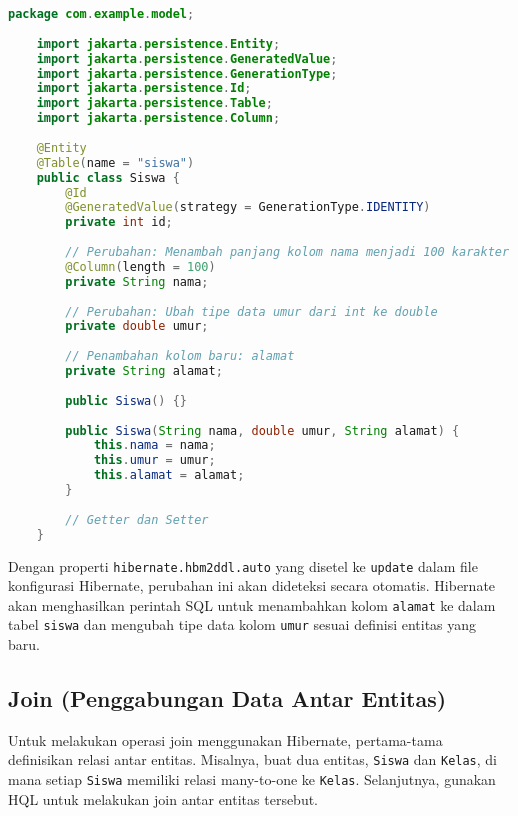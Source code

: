 \begin{lstlisting}[language=Java, style=JavaStyle]
	package com.example.model;
	
	import jakarta.persistence.Entity;
	import jakarta.persistence.GeneratedValue;
	import jakarta.persistence.GenerationType;
	import jakarta.persistence.Id;
	import jakarta.persistence.Table;
	import jakarta.persistence.Column;
	
	@Entity
	@Table(name = "siswa")
	public class Siswa {
		@Id
		@GeneratedValue(strategy = GenerationType.IDENTITY)
		private int id;
		
		// Perubahan: Menambah panjang kolom nama menjadi 100 karakter
		@Column(length = 100)
		private String nama;
		
		// Perubahan: Ubah tipe data umur dari int ke double
		private double umur;
		
		// Penambahan kolom baru: alamat
		private String alamat;
		
		public Siswa() {}
		
		public Siswa(String nama, double umur, String alamat) {
			this.nama = nama;
			this.umur = umur;
			this.alamat = alamat;
		}
		
		// Getter dan Setter
	}
\end{lstlisting}

Dengan properti \texttt{hibernate.hbm2ddl.auto} yang disetel ke \texttt{update} dalam file konfigurasi Hibernate, perubahan ini akan dideteksi secara otomatis. Hibernate akan menghasilkan perintah SQL untuk menambahkan kolom \texttt{alamat} ke dalam tabel \texttt{siswa} dan mengubah tipe data kolom \texttt{umur} sesuai definisi entitas yang baru.


\subsection{Join (Penggabungan Data Antar Entitas)}

Untuk melakukan operasi join menggunakan Hibernate, pertama-tama definisikan relasi antar entitas. Misalnya, buat dua entitas, \texttt{Siswa} dan \texttt{Kelas}, di mana setiap \texttt{Siswa} memiliki relasi many-to-one ke \texttt{Kelas}. Selanjutnya, gunakan HQL untuk melakukan join antar entitas tersebut.

